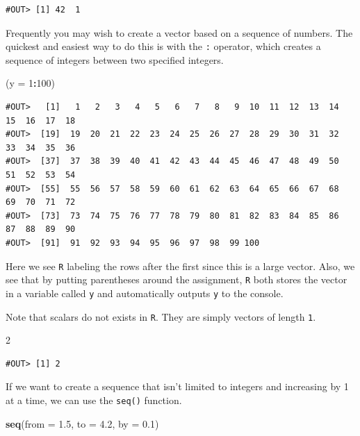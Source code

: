 \documentclass[]{book}
\newenvironment{Shaded}{\begin{snugshade}}{\end{snugshade}}
\newcommand{\KeywordTok}[1]{\textcolor[rgb]{0.13,0.29,0.53}{\textbf{#1}}}
\newcommand{\DataTypeTok}[1]{\textcolor[rgb]{0.13,0.29,0.53}{#1}}
\newcommand{\DecValTok}[1]{\textcolor[rgb]{0.00,0.00,0.81}{#1}}
\newcommand{\FloatTok}[1]{\textcolor[rgb]{0.00,0.00,0.81}{#1}}
\newcommand{\OperatorTok}[1]{\textcolor[rgb]{0.81,0.36,0.00}{\textbf{#1}}}
\newcommand{\NormalTok}[1]{#1}
\begin{document}
\begin{verbatim}
#OUT> [1] 42  1
\end{verbatim}

Frequently you may wish to create a vector based on a sequence of
numbers. The quickest and easiest way to do this is with the \texttt{:}
operator, which creates a sequence of integers between two specified
integers.

\begin{Shaded}
\begin{Highlighting}[]
\NormalTok{(}\DataTypeTok{y =} \DecValTok{1}\OperatorTok{:}\DecValTok{100}\NormalTok{)}
\end{Highlighting}
\end{Shaded}

\begin{verbatim}
#OUT>   [1]   1   2   3   4   5   6   7   8   9  10  11  12  13  14  15  16  17  18
#OUT>  [19]  19  20  21  22  23  24  25  26  27  28  29  30  31  32  33  34  35  36
#OUT>  [37]  37  38  39  40  41  42  43  44  45  46  47  48  49  50  51  52  53  54
#OUT>  [55]  55  56  57  58  59  60  61  62  63  64  65  66  67  68  69  70  71  72
#OUT>  [73]  73  74  75  76  77  78  79  80  81  82  83  84  85  86  87  88  89  90
#OUT>  [91]  91  92  93  94  95  96  97  98  99 100
\end{verbatim}

Here we see \texttt{R} labeling the rows after the first since this is a
large vector. Also, we see that by putting parentheses around the
assignment, \texttt{R} both stores the vector in a variable called
\texttt{y} and automatically outputs \texttt{y} to the console.

Note that scalars do not exists in \texttt{R}. They are simply vectors
of length \texttt{1}.

\begin{Shaded}
\begin{Highlighting}[]
\DecValTok{2}
\end{Highlighting}
\end{Shaded}

\begin{verbatim}
#OUT> [1] 2
\end{verbatim}

If we want to create a sequence that isn't limited to integers and
increasing by 1 at a time, we can use the \texttt{seq()} function.

\begin{Shaded}
\begin{Highlighting}[]
\KeywordTok{seq}\NormalTok{(}\DataTypeTok{from =} \FloatTok{1.5}\NormalTok{, }\DataTypeTok{to =} \FloatTok{4.2}\NormalTok{, }\DataTypeTok{by =} \FloatTok{0.1}\NormalTok{)}
\end{Highlighting}
\end{Shaded}
\end{document}
